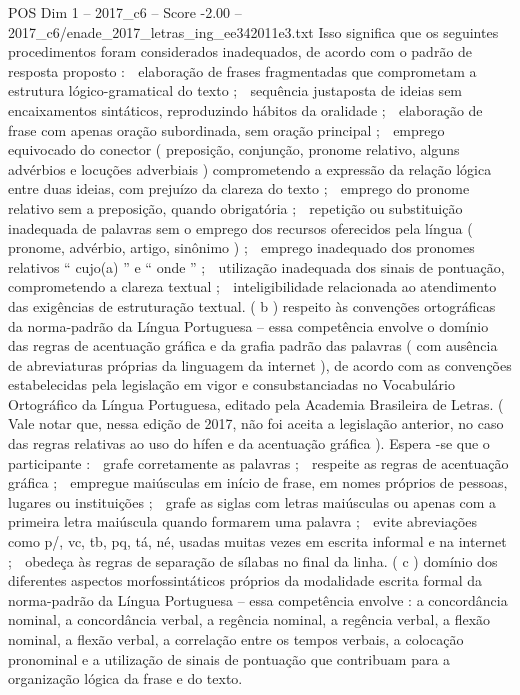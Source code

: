 \begin{textsample}{POS Dim 1 – 2017\_c6 – Score -2.00 – 2017\_c6/enade\_2017\_letras\_ing\_ee342011e3.txt}
Isso significa que os seguintes procedimentos foram considerados inadequados, de acordo com o padrão de resposta proposto :  elaboração de frases fragmentadas que comprometam a estrutura lógico-gramatical do texto ;  sequência justaposta de ideias sem encaixamentos sintáticos, reproduzindo hábitos da oralidade ;  elaboração de frase com apenas oração subordinada, sem oração principal ;  emprego equivocado do conector ( preposição, conjunção, pronome relativo, alguns advérbios e locuções adverbiais ) comprometendo a expressão da relação lógica entre duas ideias, com prejuízo da clareza do texto ;  emprego do pronome relativo sem a preposição, quando obrigatória ;  repetição ou substituição inadequada de palavras sem o emprego dos recursos oferecidos pela língua ( pronome, advérbio, artigo, sinônimo ) ;  emprego inadequado dos pronomes relativos “ cujo(a) ” e “ onde ” ;  utilização inadequada dos sinais de pontuação, comprometendo a clareza textual ;  inteligibilidade relacionada ao atendimento das exigências de estruturação textual. ( b ) respeito às convenções ortográficas da norma-padrão da Língua Portuguesa – essa competência envolve o domínio das regras de acentuação gráfica e da grafia padrão das palavras ( com ausência de abreviaturas próprias da linguagem da internet ), de acordo com as convenções estabelecidas pela legislação em vigor e consubstanciadas no Vocabulário Ortográfico da Língua Portuguesa, editado pela Academia Brasileira de Letras. ( Vale notar que, nessa edição de 2017, não foi aceita a legislação anterior, no caso das regras relativas ao uso do hífen e da acentuação gráfica ).
Espera -se que o participante :  grafe corretamente as palavras ;  respeite as regras de acentuação gráfica ;  empregue maiúsculas em início de frase, em nomes próprios de pessoas, lugares ou instituições ;  grafe as siglas com letras maiúsculas ou apenas com a primeira letra maiúscula quando formarem uma palavra ;  evite abreviações como p/, vc, tb, pq, tá, né, usadas muitas vezes em escrita informal e na internet ;  obedeça às regras de separação de sílabas no final da linha. ( c ) domínio dos diferentes aspectos morfossintáticos próprios da modalidade escrita formal da norma-padrão da Língua Portuguesa – essa competência envolve : a concordância nominal, a concordância verbal, a regência nominal, a regência verbal, a flexão nominal, a flexão verbal, a correlação entre os tempos verbais, a colocação pronominal e a utilização de sinais de pontuação que contribuam para a organização lógica da frase e do texto.

\end{textsample}
